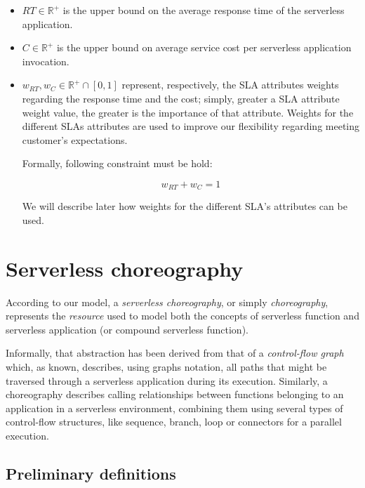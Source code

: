 \documentclass[12pt,a4paper]{report}
\newcommand{\Rplus}{\mathbb{R}^+}
\begin{document}
\begin{itemize}
	\item $RT \in \mathbb{R}^+$ is the upper bound on the average
	response time of the serverless application.
	
	\item $C \in \mathbb{R}^+$ is the upper bound on average service cost per serverless application invocation.
	
	\item $w_{RT}, w_{C} \in \Rplus \cap \left[ 0,1 \right]$ represent, respectively, the SLA attributes weights regarding the response time and the cost; simply, greater a SLA attribute weight value, the greater is the importance of that attribute. Weights for the different SLAs attributes are used to improve our flexibility regarding meeting customer's expectations. 
	
	Formally, following constraint must be hold:
	
	\begin{equation}
		w_{RT} + w_{C} = 1
	\end{equation}

	We will describe later how weights for the different SLA's attributes can be used.
\end{itemize}

\section{Serverless choreography}

According to our model, a \textit{serverless choreography}, or simply \textit{choreography}, represents the \textit{resource} used to model both the concepts of serverless function and serverless application (or compound serverless function).

Informally, that abstraction has been derived from that of a \textit{control-flow graph} which, as known, describes, using graphs notation, all paths that might be traversed through a serverless application during its execution. Similarly, a choreography describes calling relationships between functions belonging to an application in a serverless environment, combining them using several types of control-flow structures, like sequence, branch, loop or connectors for a parallel execution. 

\subsection{Preliminary definitions}
\end{document}
